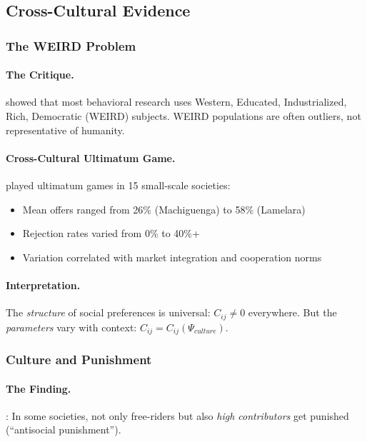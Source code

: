 \documentclass[12pt,a4paper]{article}
\begin{document}
\subsection{Cross-Cultural Evidence}

\subsubsection{The WEIRD Problem}

\paragraph{The Critique.}
\citet{henrich2010} showed that most behavioral research uses
Western, Educated, Industrialized, Rich, Democratic (WEIRD) subjects.
WEIRD populations are often outliers, not representative of humanity.

\paragraph{Cross-Cultural Ultimatum Game.}
\citet{henrich2000} played ultimatum games in 15 small-scale societies:
\begin{itemize}
  \item Mean offers ranged from 26\% (Machiguenga) to 58\% (Lamelara)
  \item Rejection rates varied from 0\% to 40\%+
  \item Variation correlated with market integration and cooperation norms
\end{itemize}

\paragraph{Interpretation.}
The \emph{structure} of social preferences is universal: $C_{ij} \neq 0$ everywhere.
But the \emph{parameters} vary with context: $C_{ij} = C_{ij}(\Psi_{culture})$.

\subsubsection{Culture and Punishment}

\paragraph{The Finding.}
\citet{herrmannthoeni2008}: In some societies, not only free-riders but also
\emph{high contributors} get punished (``antisocial punishment'').
\end{document}
